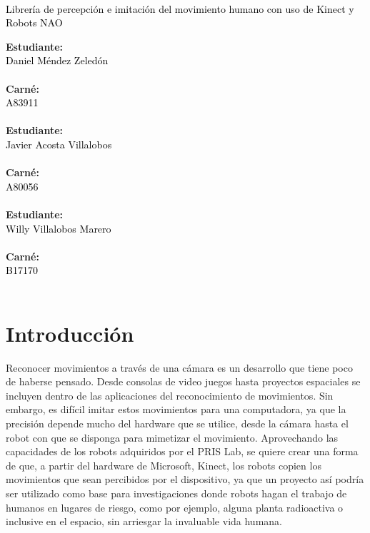 \documentclass[letterpaper]{article}
\newcommand{\uic}{black} %
\newcommand{\uim}{\\} %
\newcommand{\userinput}[1]{\textcolor{\uic}{\uim#1\uim}}
\begin{document}
\vspace*{2cm}

\begin{center}
\Huge
\userinput{Librería de percepción e imitación del movimiento humano con uso de Kinect y Robots NAO}
\vspace*{1cm}
\end{center}

\noindent
\small\baselineskip=14pt
\textbf{Estudiante:} \userinput{Daniel Méndez Zeledón}\\
\textbf{Carné:} \userinput{A83911}\\
\textbf{Estudiante:} \userinput{Javier Acosta Villalobos}\\
\textbf{Carné:} \userinput{A80056}\\
\textbf{Estudiante:} \userinput{Willy Villalobos Marero}\\
\textbf{Carné:} \userinput{B17170}\\


\section{Introducción}

Reconocer movimientos a través de una cámara es un desarrollo que tiene poco de haberse pensado. Desde consolas de video juegos hasta proyectos espaciales se incluyen dentro de las aplicaciones del reconocimiento de movimientos. Sin embargo, es difícil imitar estos movimientos para una computadora, ya que la precisión depende mucho del hardware que se utilice, desde la cámara hasta el robot con que se disponga para mimetizar el movimiento. Aprovechando las capacidades de los robots adquiridos por el PRIS Lab, se quiere crear una forma de que, a partir del hardware de Microsoft, Kinect, los robots copien los movimientos que sean percibidos por el dispositivo, ya que un proyecto así podría ser utilizado como base para investigaciones donde robots hagan el trabajo de humanos en lugares de riesgo, como por ejemplo, alguna planta radioactiva o inclusive en el espacio, sin arriesgar la invaluable vida humana.

\end{document}
